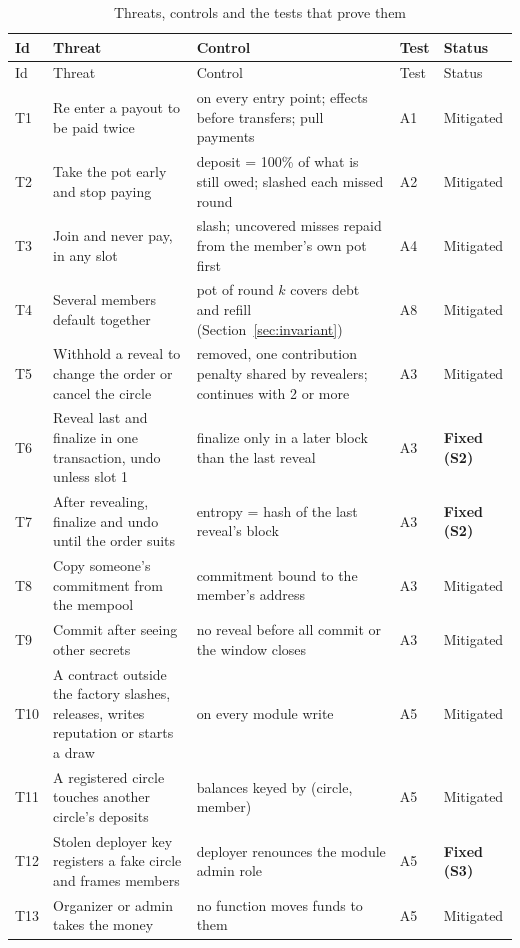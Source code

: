 {\small
\begin{xltabular}{\textwidth}{@{}P{0.7cm}P{4.2cm}LP{1.0cm}P{1.6cm}@{}}
\caption{Threats, controls and the tests that prove them}\label{tab:threats}\\
\toprule
Id & Threat & Control & Test & Status \\
\midrule
\endfirsthead
\toprule
Id & Threat & Control & Test & Status \\
\midrule
\endhead
\bottomrule
\endfoot
T1 & Re enter a payout to be paid twice &  on every entry point; effects before transfers; pull payments & A1 & Mitigated \\
T2 & Take the pot early and stop paying & deposit = 100\% of what is still owed; slashed each missed round & A2 & Mitigated \\
T3 & Join and never pay, in any slot & slash; uncovered misses repaid from the member's own pot first & A4 & Mitigated \\
T4 & Several members default together & pot of round $k$ covers debt and refill (Section~\ref{sec:invariant}) & A8 & Mitigated \\
T5 & Withhold a reveal to change the order or cancel the circle & removed, one contribution penalty shared by revealers; continues with 2 or more & A3 & Mitigated \\
T6 & Reveal last and finalize in one transaction, undo unless slot 1 & finalize only in a later block than the last reveal & A3 & \textbf{Fixed (S2)} \\
T7 & After revealing, finalize and undo until the order suits & entropy = hash of the last reveal's block & A3 & \textbf{Fixed (S2)} \\
T8 & Copy someone's commitment from the mempool & commitment bound to the member's address & A3 & Mitigated \\
T9 & Commit after seeing other secrets & no reveal before all commit or the window closes & A3 & Mitigated \\
T10 & A contract outside the factory slashes, releases, writes reputation or starts a draw &  on every module write & A5 & Mitigated \\
T11 & A registered circle touches another circle's deposits & balances keyed by (circle, member) & A5 & Mitigated \\
T12 & Stolen deployer key registers a fake circle and frames members & deployer renounces the module admin role & A5 & \textbf{Fixed (S3)} \\
T13 & Organizer or admin takes the money & no function moves funds to them & A5 & Mitigated \\

\end{xltabular}}
